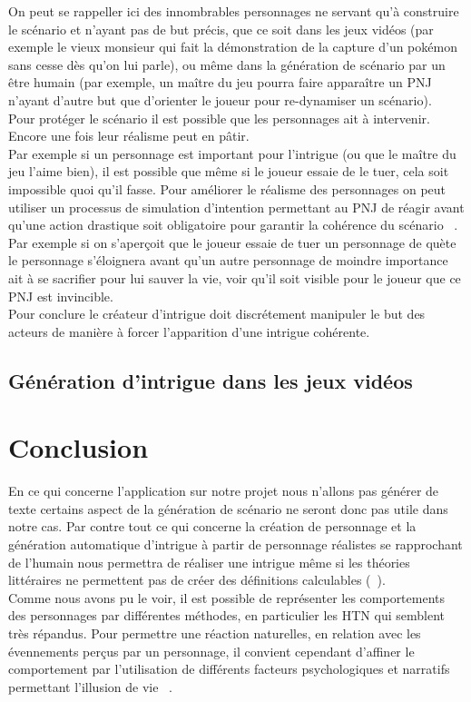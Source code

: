 \documentclass[asi]{picINSA}
\begin{document}
On peut se rappeller ici des innombrables personnages ne servant qu'à construire le scénario et n'ayant pas de but précis, que ce soit dans les jeux vidéos (par exemple le vieux monsieur qui fait la démonstration de la capture d'un pokémon sans cesse dès qu'on lui parle), ou même dans la génération de scénario par un être humain (par exemple, un maître du jeu pourra faire apparaître un PNJ n'ayant d'autre but que d'orienter le joueur pour re-dynamiser un scénario). \\

Pour protéger le scénario il est possible que les personnages ait à intervenir. Encore une fois leur réalisme peut en pâtir. \\

Par exemple si un personnage est important pour l'intrigue (ou que le maître du jeu l'aime bien), il est possible que même si le joueur essaie de le tuer, cela soit impossible quoi qu'il fasse. Pour améliorer le réalisme des personnages on peut utiliser un processus de simulation d'intention permettant au PNJ de réagir avant qu'une action drastique soit obligatoire pour garantir la cohérence du scénario ~\cite{Ciarlini:2010:ERP:1658866.1658874}. Par exemple si on s'aperçoit que le joueur essaie de tuer un personnage de quète le personnage s'éloignera avant qu'un autre personnage de moindre importance ait à se sacrifier pour lui sauver la vie, voir qu'il soit visible pour le joueur que ce PNJ est invincible. \\

Pour conclure le créateur d'intrigue doit discrétement manipuler le but des acteurs de manière à forcer l'apparition d'une intrigue cohérente.

\section{Génération d'intrigue dans les jeux vidéos}



\chapter*{Conclusion}

En ce qui concerne l'application sur notre projet nous n'allons pas générer de texte certains aspect de la génération de scénario ne seront donc pas utile dans notre cas. Par contre tout ce qui concerne la création de personnage et la génération automatique d'intrigue à partir de personnage réalistes se rapprochant de l'humain nous permettra de réaliser une intrigue même si les théories littéraires ne permettent pas de créer des définitions calculables (~\cite{Callaway2002213}). \\

Comme nous avons pu le voir, il est possible de représenter les comportements des personnages par différentes méthodes, en particulier les HTN qui semblent très répandus. Pour permettre une réaction naturelles, en relation avec les évennements perçus par un personnage, il convient cependant d'affiner le comportement par l'utilisation de différents facteurs psychologiques et narratifs permettant l'illusion de vie ~\cite{Bates94therole}.


{}

\end{document}
